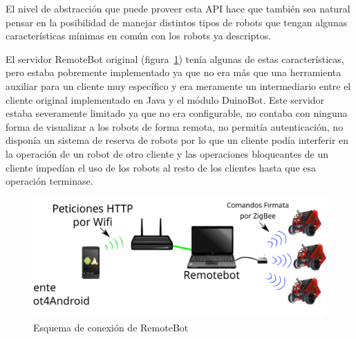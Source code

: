 El nivel de abstracción que puede proveer esta API hace que también sea
natural pensar en la posibilidad de manejar distintos tipos de robots
que tengan algunas características mínimas en común con los robots ya
descriptos.

El servidor RemoteBot original (figura~\ref{fig:arquitectura_remotebot})
tenía algunas de estas características, pero
estaba pobremente implementado ya que no era más que una herramienta auxiliar
para un cliente muy específico y era meramente un intermediario entre el
cliente original implementado en Java y el módulo DuinoBot. Este servidor
estaba severamente limitado
ya que no era configurable, no contaba con ninguna forma de visualizar a los
robots de forma remota, no permitía autenticación, no disponía un sistema
de reserva de robots por lo que un cliente podía interferir en la operación
de un robot de otro cliente y las operaciones bloqueantes de un cliente
impedían el uso de los robots al resto de los clientes hasta que esa operación
terminase.


\begin{figure}
    \centering
    \includegraphics[width=\textwidth]{figures/arquitectura_remotebot}
    \caption{Esquema de conexión de RemoteBot}
    \label{fig:arquitectura_remotebot}
\end{figure}


